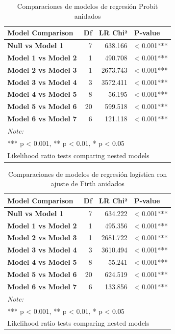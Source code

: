 \documentclass[
  spanish,
  10pt,
]{article}
\begin{document}
\begin{table}[H]
\centering
\caption{\label{tab:unnamed-chunk-10}Comparaciones de modelos de regresión Probit anidados}
\centering
\fontsize{9}{11}\selectfont
\begin{tabular}[t]{>{}lrrl}
\toprule
Model Comparison & Df & LR Chi² & P-value\\
\midrule
\textbf{Null vs Model 1} & 7 & 638.166 & < 0.001***\\
\textbf{Model 1 vs Model 2} & 1 & 490.708 & < 0.001***\\
\textbf{Model 2 vs Model 3} & 1 & 2673.743 & < 0.001***\\
\textbf{Model 3 vs Model 4} & 3 & 3572.411 & < 0.001***\\
\textbf{Model 4 vs Model 5} & 8 & 56.195 & < 0.001***\\
\addlinespace
\textbf{Model 5 vs Model 6} & 20 & 599.518 & < 0.001***\\
\textbf{Model 6 vs Model 7} & 6 & 121.118 & < 0.001***\\
\bottomrule
\multicolumn{4}{l}{\rule{0pt}{1em}\textit{Note: }}\\
\multicolumn{4}{l}{\rule{0pt}{1em}*** p < 0.001, ** p < 0.01, * p < 0.05}\\
\multicolumn{4}{l}{\rule{0pt}{1em}Likelihood ratio tests comparing nested models}\\
\end{tabular}
\end{table}

\begin{table}[H]
\centering
\caption{\label{tab:unnamed-chunk-11}Comparaciones de modelos de regresión logística con ajuste de Firth anidados}
\centering
\fontsize{9}{11}\selectfont
\begin{tabular}[t]{>{}lrrl}
\toprule
Model Comparison & Df & LR Chi² & P-value\\
\midrule
\textbf{Null vs Model 1} & 7 & 634.222 & < 0.001***\\
\textbf{Model 1 vs Model 2} & 1 & 495.356 & < 0.001***\\
\textbf{Model 2 vs Model 3} & 1 & 2681.722 & < 0.001***\\
\textbf{Model 3 vs Model 4} & 3 & 3610.494 & < 0.001***\\
\textbf{Model 4 vs Model 5} & 8 & 55.241 & < 0.001***\\
\addlinespace
\textbf{Model 5 vs Model 6} & 20 & 624.519 & < 0.001***\\
\textbf{Model 6 vs Model 7} & 6 & 133.856 & < 0.001***\\
\bottomrule
\multicolumn{4}{l}{\rule{0pt}{1em}\textit{Note: }}\\
\multicolumn{4}{l}{\rule{0pt}{1em}*** p < 0.001, ** p < 0.01, * p < 0.05}\\
\multicolumn{4}{l}{\rule{0pt}{1em}Likelihood ratio tests comparing nested models}\\
\end{tabular}
\end{table}
\end{document}
